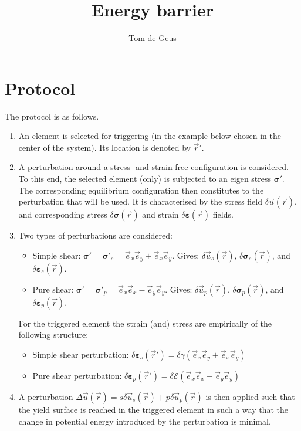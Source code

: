 \documentclass[fleqn]{goose-article}
\title{Energy barrier}
\author{Tom de Geus}
\begin{document}
\maketitle

\section*{Protocol}

The protocol is as follows.
\begin{enumerate}
    \item An element is selected for triggering
    (in the example below chosen in the center of the system).
    Its location is denoted by $\vec{r}'$.

    \item A perturbation around a stress- and strain-free configuration is considered.
    To this end, the selected element (only) is subjected to an eigen stress
    $\bm{\sigma}'$.
    The corresponding equilibrium configuration then constitutes to
    the perturbation that will be used.
    It is characterised by the stress field $\delta \vec{u} (\vec{r})$, and corresponding
    stress $\delta \bm{\sigma} (\vec{r})$
    and strain $\delta \bm{\varepsilon} (\vec{r})$ fields.

    \item Two types of perturbations are considered:
    \begin{itemize}
        \item Simple shear:
        $\bm{\sigma}' = \bm{\sigma}'_s = \vec{e}_x \vec{e}_y + \vec{e}_x \vec{e}_y$.
        Gives: $\delta \vec{u}_s (\vec{r})$, $\delta \bm{\sigma}_s (\vec{r})$, and
        $\delta \bm{\varepsilon}_s (\vec{r})$.

        \item Pure shear:
        $\bm{\sigma}' = \bm{\sigma}'_p = \vec{e}_x \vec{e}_x - \vec{e}_y \vec{e}_y$.
        Gives: $\delta \vec{u}_p (\vec{r})$, $\delta \bm{\sigma}_p (\vec{r})$, and
        $\delta \bm{\varepsilon}_p (\vec{r})$.
    \end{itemize}

    For the triggered element the strain (and) stress are empirically
    of the following structure:
    \begin{itemize}
        \item Simple shear perturbation:
        $\delta \bm{\varepsilon}_s (\vec{r}') = \delta \gamma (\vec{e}_x \vec{e}_y + \vec{e}_x \vec{e}_y)$
        \item Pure shear perturbation:
        $\delta \bm{\varepsilon}_p (\vec{r}') = \delta \mathcal{E} (\vec{e}_x \vec{e}_x - \vec{e}_y \vec{e}_y)$
    \end{itemize}

    \item A perturbation $\Delta \vec{u}(\vec{r}) = s \delta \vec{u}_s (\vec{r}) + p \delta \vec{u}_p (\vec{r})$
    is then applied such that the yield surface is reached in the triggered element in such
    a way that the change in potential energy introduced by the perturbation is minimal.

\end{enumerate}
\end{document}

